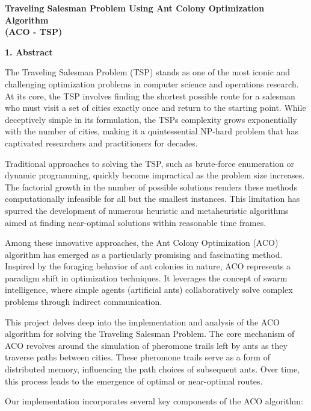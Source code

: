 \documentclass[
]{article}
\author{Darshan Odedara}
\date{}
\begin{document}
\begin{center}
{\LARGE \textbf{Traveling Salesman Problem Using Ant Colony Optimization Algorithm}} \\
{\LARGE \textbf{(ACO - TSP)}}
\end{center}

\vspace{3cm}

\textbf{1. Abstract}

The Traveling Salesman Problem (TSP) stands as one of the most iconic
and challenging optimization problems in computer science and operations
research. At its core, the TSP involves finding the shortest possible
route for a salesman who must visit a set of cities exactly once and
return to the starting point. While deceptively simple in its
formulation, the TSP\textquotesingle s complexity grows exponentially
with the number of cities, making it a quintessential NP-hard problem
that has captivated researchers and practitioners for decades.

Traditional approaches to solving the TSP, such as brute-force
enumeration or dynamic programming, quickly become impractical as the
problem size increases. The factorial growth in the number of possible
solutions renders these methods computationally infeasible for all but
the smallest instances. This limitation has spurred the development of
numerous heuristic and metaheuristic algorithms aimed at finding
near-optimal solutions within reasonable time frames.

Among these innovative approaches, the Ant Colony Optimization (ACO)
algorithm has emerged as a particularly promising and fascinating
method. Inspired by the foraging behavior of ant colonies in nature, ACO
represents a paradigm shift in optimization techniques. It leverages the
concept of swarm intelligence, where simple agents (artificial ants)
collaboratively solve complex problems through indirect communication.

This project delves deep into the implementation and analysis of the ACO
algorithm for solving the Traveling Salesman Problem. The core mechanism
of ACO revolves around the simulation of pheromone trails left by ants
as they traverse paths between cities. These pheromone trails serve as a
form of distributed memory, influencing the path choices of subsequent
ants. Over time, this process leads to the emergence of optimal or
near-optimal routes.

Our implementation incorporates several key components of the ACO
algorithm:
\end{document}
